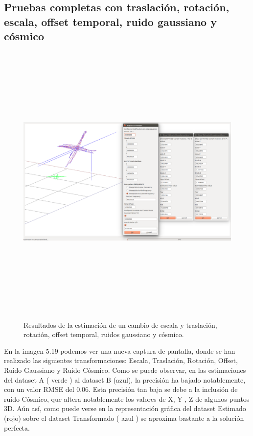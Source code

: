 \subsection{Pruebas completas con traslación, rotación, escala, offset temporal, ruido gaussiano y cósmico}
\begin{figure}[H]
\begin{center}
\label{fig:opciones de View}\includegraphics[height=14.0cm,width=18.0cm]{img/cap6/Escala_Trasla_Rota_Offset_Gauss_CosmicNoise_abba.png}
\hspace{0.5cm}
\end{center}
\caption{Resultados de la estimación de un cambio de escala y traslación, rotación, offset temporal, ruidos gaussiano y cósmico.}
\end{figure}
En la imagen 5.19 podemos ver una nueva captura de pantalla, donde se han realizado las siguientes transformaciones: Escala, Traslación, Rotación, Offset, Ruido Gaussiano y Ruido Cósmico.
Como se puede observar, en las estimaciones del dataset A ( verde ) al dataset B (azul), la precisión ha bajado notablemente, con un valor RMSE del 0.06.
Esta precisión tan baja se debe a la inclusión de ruido Cósmico, que altera notablemente los valores de X, Y , Z  de algunos puntos 3D.
Aún así, como puede verse en  la representación gráfica del dataset Estimado (rojo) sobre el dataset Transformado ( azul ) se aproxima bastante a la solución perfecta.

